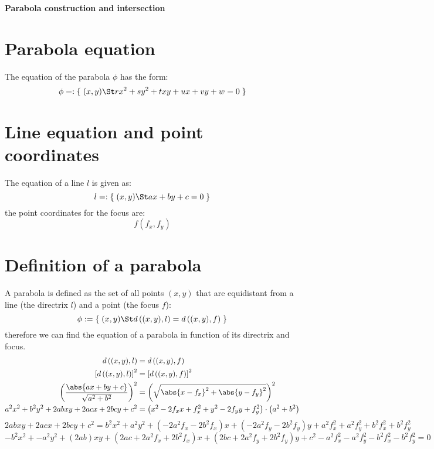 \documentclass[11pt,a4paper,english]{article}
\begin{document}
    {\centering\huge\textbf{Parabola construction and intersection}\par}

    \vspace{1cm}

    \section*{Parabola equation}
    The equation of the parabola \(\phi\) has the form:
    \[
    	\phi =: \{\;(x,y) \St rx^{2} + sy^{2} + txy + ux + vy + w = 0\;\}
    \]

    \section*{Line equation and point coordinates}
    The equation of a line \(l\) is given as:
    \[
    	l =: \{\;(x,y) \St ax + by + c = 0\;\}
    \]
    the point coordinates for the focus are:
    \[
    	f(f_{x},f_{y})
    \]

    \section*{Definition of a parabola}
    A parabola is defined as the set of all points \((x,y)\) that are equidistant from a line (the directrix \(l\)) and a point (the focus \(f\)):
    \[
    	\phi := \{\;(x,y) \St d\left((x,y),l\right) = d\left((x,y),f\right)\;\}
    \]
    therefore we can find the equation of a parabola in function of its directrix and focus.
    \begin{align*}
    d\left((x,y),l\right) &= d\left((x,y),f\right) \\
	\left[d\left((x,y),l\right)\right]^2 &= \left[d\left((x,y),f\right)\right]^2 \\
	\left(\frac{\abs{ax + by + c}}{\sqrt{a^{2} + b^{2}}}\right)^{2} &= \left(\sqrt{\abs{x - f_{x}}^{2} + \abs{y - f_{y}}^{2}}\right)^{2} \\
	a^{2}x^{2} + b^{2}y^{2} + 2abxy + 2acx + 2bcy + c^{2} &= \left(x^{2} - 2f_{x}x + f_{x}^{2} + y^{2} - 2f_{y}y + f_{y}^{2}\right) \cdot \left(a^{2} + b^{2}\right)
	\end{align*}
	\[
		2abxy + 2acx + 2bcy + c^{2} = b^{2}x^{2} + a^{2}y^{2} + (-2a^{2}f_{x}-2b^{2}f_{x})x + (-2a^{2}f_{y}-2b^{2}f_{y})y + a^{2}f_{x}^{2} + a^{2}f_{y}^{2} + b^{2}f_{x}^{2} + b^{2}f_{y}^{2}
	\]
	\[
		-b^{2}x^{2} + -a^{2}y^{2} + (2ab)xy + (2ac + 2a^{2}f_{x} + 2b^{2}f_{x})x + (2bc + 2a^{2}f_{y} + 2b^{2}f_{y})y + c^{2} - a^{2}f_{x}^{2} - a^{2}f_{y}^{2} - b^{2}f_{x}^{2} - b^{2}f_{y}^{2} = 0
	\]
	\ppar\bigskip
\end{document}
